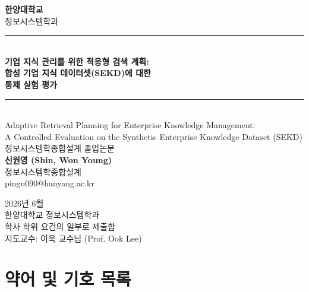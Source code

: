 \documentclass[12pt, a4paper, twoside]{report}
\begin{document}
\begin{titlepage}
\centering
\vspace*{1.5cm}

{\Large\textbf{한양대학교}}\\[0.5em]
{\large 정보시스템학과}\\[3em]

\rule{\textwidth}{1.5pt}\\[0.5em]
{\huge\bfseries 기업 지식 관리를 위한 적응형 검색 계획:\\[0.3em]
합성 기업 지식 데이터셋(SEKD)에 대한\\[0.3em]
통제 실험 평가}\\[0.5em]
\rule{\textwidth}{1.5pt}\\[2em]

{\large Adaptive Retrieval Planning for Enterprise Knowledge Management:\\
A Controlled Evaluation on the Synthetic Enterprise Knowledge Dataset (SEKD)}\\[3em]

{\large 정보시스템학종합설계 졸업논문}\\[2em]

{\large\bfseries 신원영 (Shin, Won Young)}\\[0.3em]
{\large 정보시스템학종합설계}\\[1em]
{\large pingu090@hanyang.ac.kr}\\[4em]

\vfill

{\large 2026년 6월}\\[1em]

{\normalsize
한양대학교 정보시스템학과\\
학사 학위 요건의 일부로 제출함\\[1em]
지도교수: 이욱 교수님 (Prof. Ook Lee)
}

\end{titlepage}




\clearpage
\tableofcontents

\clearpage
\listoffigures
{}

\clearpage
\listoftables
{}

\clearpage
\chapter*{약어 및 기호 목록}
\end{document}
